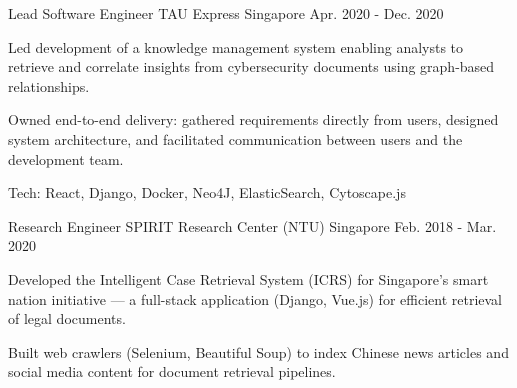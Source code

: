\begin{cventries}
  \cventry
    {Lead Software Engineer} %
    {TAU Express} %
    {Singapore} %
    {Apr. 2020 - Dec. 2020} %
    {
      \begin{cvitems} %
        \item {Led development of a knowledge management system enabling analysts to retrieve and correlate insights from cybersecurity documents using graph-based relationships.}
        \item {Owned end-to-end delivery: gathered requirements directly from users, designed system architecture, and facilitated communication between users and the development team.}
        \item {Tech: React, Django, Docker, Neo4J, ElasticSearch, Cytoscape.js}
      \end{cvitems}
    }

  \cventry
    {Research Engineer} %
    {SPIRIT Research Center (NTU)} %
    {Singapore} %
    {Feb. 2018 - Mar. 2020} %
    {
      \begin{cvitems} %
        \item {Developed the Intelligent Case Retrieval System (ICRS) for Singapore's smart nation initiative — a full-stack application (Django, Vue.js) for efficient retrieval of legal documents.}
        \item {Built web crawlers (Selenium, Beautiful Soup) to index Chinese news articles and social media content for document retrieval pipelines.}
      \end{cvitems}
    }

\end{cventries}
